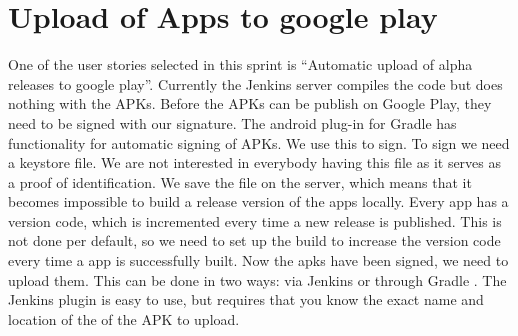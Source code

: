 \chapter{Upload of Apps to google play}
One of the user stories selected in this sprint is ``Automatic upload of alpha releases to google play''. Currently the Jenkins server compiles the code but does nothing with the APKs. Before the APKs can be publish on Google Play, they need to be signed with our signature. The android plug-in for Gradle has functionality for automatic signing of APKs. We use this to sign. To sign we need a keystore file. We are not interested in everybody having this file as it serves as a proof of identification. We save the file on the server, which means that it becomes impossible to build a release version of the apps locally.
Every app has a version code, which is incremented every time a new release is published. This is not done per default, so we need to set up the build to increase the version code every time a app is successfully built. 
Now the apks have been signed, we need to upload them. This can be done in two ways: via Jenkins \parencite{jenkins-play-plugin} or through Gradle \parencite{gradle-play-plugin}. The Jenkins plugin is easy to use, but requires that you know the exact name and location of the of the APK to upload.